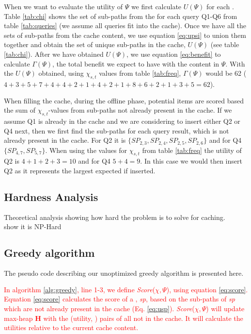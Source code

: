 When we want to evaluate the utility of $\Psi$ we first calculate $U(\Psi)$ for each \spath. Table \ref{tab:chi} shows the set of sub-paths from the \spaths for each query Q1-Q6 from table \ref{tab:queries} (we assume all queries fit into the cache). Once we have all the sets of sub-paths from the cache content, we use equation \ref{eq:upsi} to union them together and obtain the set of unique sub-paths in the cache, $U(\Psi)$ (see table \ref{tab:chi}). After we have obtained $U(\Psi)$, we use equation \ref{eq:benefit} to calculate $\Gamma(\Psi)$, the total benefit we expect to have with the content in $\Psi$. With the $U(\Psi)$ obtained, using $\chi_{s,t}$ values from table \ref{tab:freq}, $\Gamma(\Psi)$ would be 62 ($4+3+5+7+4+4+2+1+4+2+1+8+6+2+1+3+5 = 62$).

When filling the cache, during the offline phase, potential \spath items are scored based the sum of $\chi_{s,t}$-values from sub-paths not already present in the cache. If we assume Q1 is already in the cache and we are considering to insert either Q2 or Q4 next, then we first find the sub-paths for each query result, which is not already present in the cache. For Q2 it is $\{SP_{2,3},SP_{2,4},SP_{2,5},SP_{2,6}\}$ and for Q4 $\{SP_{4,7},SP_{5,7}\}$. When using the values for $\chi_{s,t}$ from table \ref{tab:freq} the utility of Q2 is $4+1+2+3=10$ and for Q4 $5+4=9$. In this case we would then insert Q2 as it represents the largest expected if inserted.

\subsection{Hardness Analysis}
Theoretical analysis showing how hard the problem is to solve for \spath caching.\\
show it is NP-Hard
 

\subsection{Greedy algorithm}
The pseudo code describing our unoptimized greedy algorithm is presented here.

\textcolor{red}{
In algorithm \ref{alg:greedy}, line 1-3, we define \textit{Score}($\chi, \Psi$), using equation \ref{eq:score}. Equation \ref{eq:score} calculates the score of a \spathns, \textit{sp}, based on the sub-paths of \textit{sp} which are not already present in the cache (Eq. \ref{eq:usp}). \textit{Score}($\chi, \Psi$) will update max-heap \textbf{H} with the (utility, \spath) pairs of all \spath not in the cache. It will calculate the utilities relative to the current cache content. 
}

